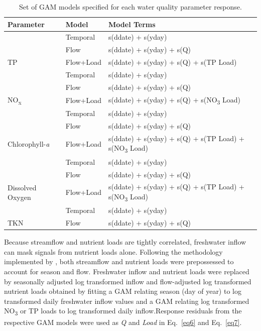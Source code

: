 \documentclass[sn-basic,referee,lineno,pdflatex]{sn-jnl}
\begin{document}
\begin{table}

\caption{\label{tab:table3}Set of GAM models specified for each water quality parameter response.}
\centering
\begin{tabular}[t]{lll}
\toprule
Parameter & Model & Model Terms\\
\midrule
 & Temporal & s(ddate) + s(yday)\\

 & Flow & s(ddate) + s(yday) + s(Q)\\

\multirow{-3}{*}{\raggedright\arraybackslash TP} & Flow+Load & s(ddate) + s(yday) + s(Q) + s(TP Load)\\
\cmidrule{1-3}
 & Temporal & s(ddate) + s(yday)\\

 & Flow & s(ddate) + s(yday) + s(Q)\\

\multirow{-3}{*}{\raggedright\arraybackslash NO\textsubscript{x}} & Flow+Load & s(ddate) + s(yday) + s(Q) + s(NO\textsubscript{3} Load)\\
\cmidrule{1-3}
 & Temporal & s(ddate) + s(yday)\\

 & Flow & s(ddate) + s(yday) + s(Q)\\

\multirow{-3}{*}{\raggedright\arraybackslash Chlorophyll-\textit{a}} & Flow+Load & s(ddate) + s(yday) + s(Q) + s(TP Load) + s(NO\textsubscript{3} Load)\\
\cmidrule{1-3}
 & Temporal & s(ddate) + s(yday)\\

 & Flow & s(ddate) + s(yday) + s(Q)\\

\multirow{-3}{*}{\raggedright\arraybackslash Dissolved Oxygen} & Flow+Load & s(ddate) + s(yday) + s(Q) + s(TP Load) + s(NO\textsubscript{3}  Load)\\
\cmidrule{1-3}
 & Temporal & s(ddate) + s(yday)\\

\multirow{-2}{*}{\raggedright\arraybackslash TKN} & Flow & s(ddate) + s(yday) + s(Q)\\
\bottomrule
\end{tabular}
\end{table}

Because streamflow and nutrient loads are tightly correlated, freshwater
inflow can mask signals from nutrient loads alone. Following the
methodology implemented by
\citet{murphyNutrientImprovementsChesapeake2022}, both streamflow and
nutrient loads were prepossessed to account for season and flow.
Freshwater inflow and nutrient loads were replaced by seasonally
adjusted log transformed inflow and flow-adjusted log transformed
nutrient loads obtained by fitting a GAM relating season (day of year)
to log transformed daily freshwater inflow values and a GAM relating log
transformed NO\textsubscript{3} or TP loads to log transformed daily
inflow.Response residuals from the respective GAM models were used as
\emph{Q} and \emph{Load} in Eq.~\ref{eq6} and Eq.~\ref{eq7}.
\end{document}
